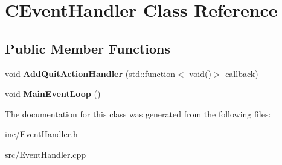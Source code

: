 \hypertarget{classCEventHandler}{\section{C\-Event\-Handler Class Reference}
\label{classCEventHandler}
}
\subsection*{Public Member Functions}
\begin{DoxyCompactItemize}
\item 
\hypertarget{classCEventHandler_a4aa21f21c987d79b17ca7dbfebb465f2}{void {\bfseries Add\-Quit\-Action\-Handler} (std\-::function$<$ void()$>$ callback)}\label{classCEventHandler_a4aa21f21c987d79b17ca7dbfebb465f2}

\item 
\hypertarget{classCEventHandler_a3e1d6d4555c196e3a46ae02534f8306f}{void {\bfseries Main\-Event\-Loop} ()}\label{classCEventHandler_a3e1d6d4555c196e3a46ae02534f8306f}

\end{DoxyCompactItemize}


The documentation for this class was generated from the following files\-:\begin{DoxyCompactItemize}
\item 
inc/Event\-Handler.\-h\item 
src/Event\-Handler.\-cpp\end{DoxyCompactItemize}
